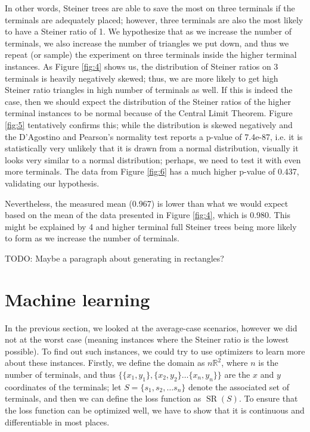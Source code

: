 \documentclass{mpaper}
\begin{document}
In other words, Steiner trees are able to save the most on three terminals if the terminals are adequately placed; however, three terminals are also the most likely to have a Steiner ratio of 1. We hypothesize that as we increase the number of terminals, we also increase the number of triangles we put down, and thus we repeat (or sample) the experiment on three terminals inside the higher terminal instances. As Figure \ref{fig:4} shows us, the distribution of Steiner ratios on 3 terminals is heavily negatively skewed; thus, we are more likely to get high Steiner ratio triangles in high number of terminals as well. If this is indeed the case, then we should expect the distribution of the Steiner ratios of the higher terminal instances to be normal because of the Central Limit Theorem. Figure \ref{fig:5} tentatively confirms this; while the distribution is skewed negatively and the D'Agostino and Pearson's normality test reports a p-value of 7.4e-87, i.e. it is statistically very unlikely that it is drawn from a normal distribution, visually it looks very similar to a normal distribution; perhaps, we need to test it with even more terminals. The data from Figure \ref{fig:6} has a much higher p-value of 0.437, validating our hypothesis.

Nevertheless, the measured mean (0.967) is lower than what we would expect based on the mean of the data presented in Figure \ref{fig:4}, which is 0.980. This might be explained by 4 and higher terminal full Steiner trees being more likely to form as we increase the number of terminals. 

TODO: Maybe a paragraph about generating in rectangles?

\section{Machine learning}


In the previous section, we looked at the average-case scenarios, however we did not at the worst case (meaning instances where the Steiner ratio is the lowest possible). To find out such instances, we could try to use optimizers to learn more about these instances. Firstly, we define the domain as $n\mathbb{R}^{2}$, where $n$ is the number of terminals, and thus $\{\{x_1, y_1\}, \{x_2, y_2\} \dots \{x_n, y_n\}\}$ are the $x$ and $y$ coordinates of the terminals; let $S=\{s_1, s_2, \dots s_n\}$ denote the associated set of terminals, and then we can define the loss function as $\operatorname{SR}(S)$. To ensure that the loss function can be optimized well, we have to show that it is continuous and differentiable in most places.
\end{document}
